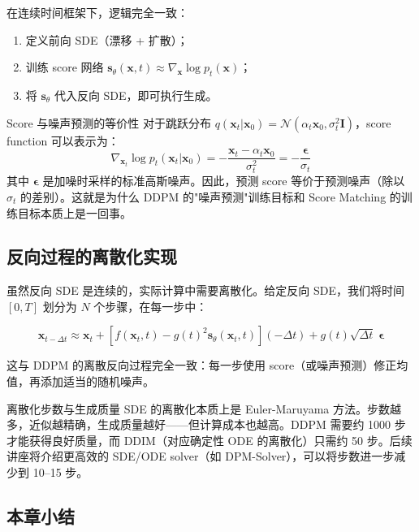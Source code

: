 \documentclass[a4paper]{article}
\begin{document}
在连续时间框架下，逻辑完全一致：
\begin{enumerate}
    \item 定义前向 SDE（漂移 + 扩散）；
    \item 训练 score 网络 $\mathbf{s}_\theta(\mathbf{x}, t) \approx \nabla_{\mathbf{x}} \log p_t(\mathbf{x})$；
    \item 将 $\mathbf{s}_\theta$ 代入反向 SDE，即可执行生成。
\end{enumerate}

\begin{knowledgebox}{Score 与噪声预测的等价性}
对于跳跃分布 $q(\mathbf{x}_t | \mathbf{x}_0) = \mathcal{N}(\alpha_t \mathbf{x}_0, \sigma_t^2 \mathbf{I})$，score function 可以表示为：
$$
\nabla_{\mathbf{x}_t} \log p_t(\mathbf{x}_t | \mathbf{x}_0) = -\frac{\mathbf{x}_t - \alpha_t \mathbf{x}_0}{\sigma_t^2} = -\frac{\boldsymbol{\epsilon}}{\sigma_t}
$$
其中 $\boldsymbol{\epsilon}$ 是加噪时采样的标准高斯噪声。因此，预测 score 等价于预测噪声（除以 $\sigma_t$ 的差别）。这就是为什么 DDPM 的"噪声预测"训练目标和 Score Matching 的训练目标本质上是一回事。
\end{knowledgebox}

\subsection{反向过程的离散化实现}

虽然反向 SDE 是连续的，实际计算中需要离散化。给定反向 SDE，我们将时间 $[0, T]$ 划分为 $N$ 个步骤，在每一步中：

$$
\mathbf{x}_{t-\Delta t} \approx \mathbf{x}_t + \left[f(\mathbf{x}_t, t) - g(t)^2 \mathbf{s}_\theta(\mathbf{x}_t, t)\right](-\Delta t) + g(t)\sqrt{\Delta t}\;\boldsymbol{\epsilon}
$$

这与 DDPM 的离散反向过程完全一致：每一步使用 score（或噪声预测）修正均值，再添加适当的随机噪声。

\begin{warningbox}{离散化步数与生成质量}
SDE 的离散化本质上是 Euler-Maruyama 方法。步数越多，近似越精确，生成质量越好——但计算成本也越高。DDPM 需要约 1000 步才能获得良好质量，而 DDIM（对应确定性 ODE 的离散化）只需约 50 步。后续讲座将介绍更高效的 SDE/ODE solver（如 DPM-Solver），可以将步数进一步减少到 10--15 步。
\end{warningbox}

\subsection{本章小结}
\end{document}
